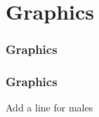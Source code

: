 \documentclass[color=usenames,dvipsnames]{beamer}\usepackage[]{graphicx}\usepackage[]{color}
\begin{document}
\section{Graphics}



\begin{frame}
  \frametitle{Graphics}
\end{frame}


\begin{frame}
  \frametitle{Graphics}
  \begin{center}
    Add a line for males
  \end{center}
\end{frame}
\end{document}
